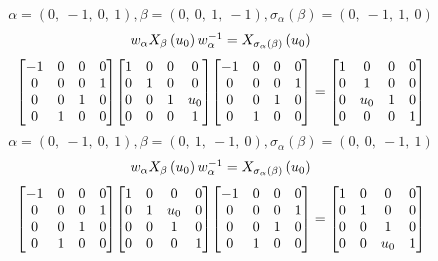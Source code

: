 \documentclass[11pt]{article}
\theoremstyle{definition}
\begin{document}
\[
\alpha = \left( 0, \  -1, \  0, \  1\right), \beta = \left( 0, \  0, \  1, \  -1\right), \sigma_{\alpha}(\beta) = \left( 0, \  -1, \  1, \  0\right)
\]
\[
\scaletoalign{\textwidth}{w_{\alpha} X_{\beta}\left(u_{0}\right) w_{\alpha}^{-1} = X_{\sigma_{\alpha}\left(\beta\right)}\left(u_{0}\right)}
\]
\[
\scaletoalign{\textwidth}{{\left[\begin{matrix}-1 & 0 & 0 & 0\\0 & 0 & 0 & 1\\0 & 0 & 1 & 0\\0 & 1 & 0 & 0\end{matrix}\right]} {\left[\begin{matrix}1 & 0 & 0 & 0\\0 & 1 & 0 & 0\\0 & 0 & 1 & u_{0}\\0 & 0 & 0 & 1\end{matrix}\right]} {\left[\begin{matrix}-1 & 0 & 0 & 0\\0 & 0 & 0 & 1\\0 & 0 & 1 & 0\\0 & 1 & 0 & 0\end{matrix}\right]} = {\left[\begin{matrix}1 & 0 & 0 & 0\\0 & 1 & 0 & 0\\0 & u_{0} & 1 & 0\\0 & 0 & 0 & 1\end{matrix}\right]}}
\]
\[
\alpha = \left( 0, \  -1, \  0, \  1\right), \beta = \left( 0, \  1, \  -1, \  0\right), \sigma_{\alpha}(\beta) = \left( 0, \  0, \  -1, \  1\right)
\]
\[
\scaletoalign{\textwidth}{w_{\alpha} X_{\beta}\left(u_{0}\right) w_{\alpha}^{-1} = X_{\sigma_{\alpha}\left(\beta\right)}\left(u_{0}\right)}
\]
\[
\scaletoalign{\textwidth}{{\left[\begin{matrix}-1 & 0 & 0 & 0\\0 & 0 & 0 & 1\\0 & 0 & 1 & 0\\0 & 1 & 0 & 0\end{matrix}\right]} {\left[\begin{matrix}1 & 0 & 0 & 0\\0 & 1 & u_{0} & 0\\0 & 0 & 1 & 0\\0 & 0 & 0 & 1\end{matrix}\right]} {\left[\begin{matrix}-1 & 0 & 0 & 0\\0 & 0 & 0 & 1\\0 & 0 & 1 & 0\\0 & 1 & 0 & 0\end{matrix}\right]} = {\left[\begin{matrix}1 & 0 & 0 & 0\\0 & 1 & 0 & 0\\0 & 0 & 1 & 0\\0 & 0 & u_{0} & 1\end{matrix}\right]}}
\]
\end{document}
